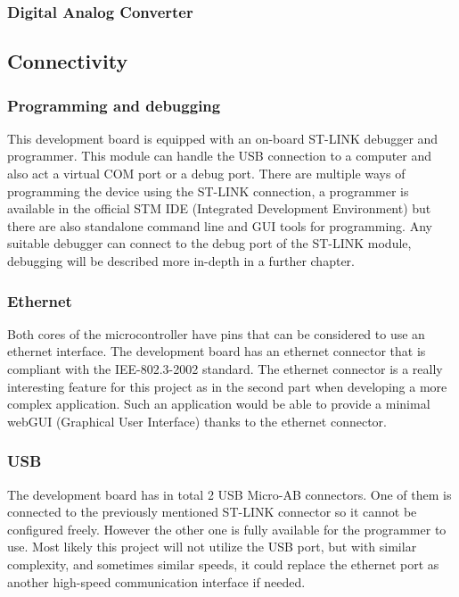 \subsubsection{Digital Analog Converter}

\subsection{Connectivity}

\subsubsection{Programming and debugging}

This development board is equipped with an on-board ST-LINK debugger and programmer. This module can handle the USB connection to a computer and also act a virtual COM port or a debug port. There are multiple ways of programming the device using the ST-LINK connection, a programmer is available in the official STM IDE (Integrated Development Environment) but there are also standalone command line and GUI tools for programming. Any suitable debugger can connect to the debug port of the ST-LINK module, debugging will be described more in-depth in a further chapter.

\subsubsection{Ethernet}

Both cores of the microcontroller have pins that can be considered to use an ethernet interface. The development board has an ethernet connector that is compliant with the IEE-802.3-2002 standard. The ethernet connector is a really interesting feature for this project as in the second part when developing a more complex application. Such an application would be able to provide a minimal webGUI (Graphical User Interface) thanks to the ethernet connector.

\subsubsection{USB}

The development board has in total 2 USB Micro-AB connectors. One of them is connected to the previously mentioned ST-LINK connector so it cannot be configured freely. However the other one is fully available for the programmer to use. Most likely this project will not utilize the USB port, but with similar complexity, and sometimes similar speeds, it could replace the ethernet port as another high-speed communication interface if needed.

